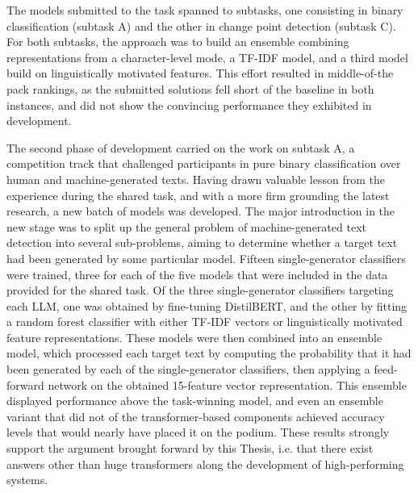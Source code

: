 The models submitted to the task spanned to subtasks, one consisting in binary classification (subtask A) and the other in change point detection (subtask C).
For both subtasks, the approach was to build an ensemble combining representations from a character-level mode, a TF-IDF model, and a third model build on linguistically motivated features.
This effort resulted in middle-of-the pack rankings, as the submitted solutions fell short of the baseline in both instances, and did not show the convincing performance they exhibited in development.

The second phase of development carried on the work on subtask A, a competition track that challenged participants in pure binary classification over human and machine-generated texts.
Having drawn valuable lesson from the experience during the shared task, and with a more firm grounding the latest research, a new batch of models was developed.
The major introduction in the new stage was to split up the general problem of machine-generated text detection into several sub-problems, aiming to determine whether a target text had been generated by some particular model.
Fifteen single-generator classifiers were trained, three for each of the five models that were included in the data provided for the shared task.
Of the three single-generator classifiers targeting each LLM, one was obtained by fine-tuning DistilBERT, and the other by fitting a random forest classifier with either TF-IDF vectors or linguistically motivated feature representations.
These models were then combined into an ensemble model, which processed each target text by computing the probability that it had been generated by each of the single-generator classifiers, then applying a feed-forward network on the obtained 15-feature vector representation.
This ensemble displayed performance above the task-winning model, and even an ensemble variant that did not of the transformer-based components achieved accuracy levels that would nearly have placed it on the podium.
These results strongly support the argument brought forward by this Thesis, i.e. that there exist answers other than huge transformers along the development of high-performing systems.
